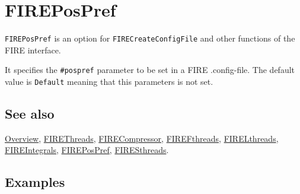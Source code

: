 \documentclass[../FeynHelpersManual.tex]{subfiles}
\begin{document}
\hypertarget{firepospref}{
\section{FIREPosPref}\label{firepospref}}

\texttt{FIREPosPref} is an option for \texttt{FIRECreateConfigFile} and
other functions of the FIRE interface.

It specifies the \texttt{\#{}\allowbreak{}pospref} parameter to be set
in a FIRE .config-file. The default value is \texttt{Default} meaning
that this parameters is not set.

\subsection{See also}

\hyperlink{toc}{Overview}, \hyperlink{firethreads}{FIREThreads},
\hyperlink{firecompressor}{FIRECompressor},
\hyperlink{firefthreads}{FIREFthreads},
\hyperlink{firelthreads}{FIRELthreads},
\hyperlink{fireintegrals}{FIREIntegrals},
\hyperlink{firepospref}{FIREPosPref},
\hyperlink{firesthreads}{FIRESthreads}.

\subsection{Examples}
\end{document}
